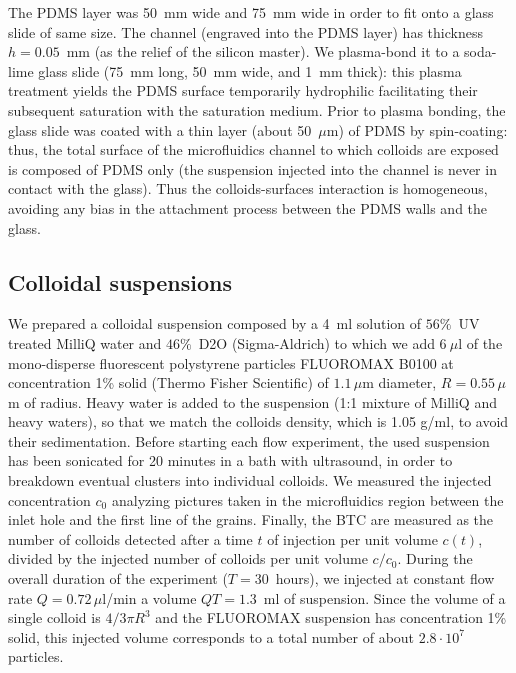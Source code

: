 \documentclass[singlecolumn,pre,notitlepage,preprintnumbers,floatfix,superscriptaddress]{revtex4-1}
\begin{document}
\noindent
The PDMS layer was 50~mm wide and 75~mm wide in order to fit onto a glass slide of same size. The channel (engraved into the PDMS layer) has thickness $h = 0.05$~mm (as the relief of the silicon master). We plasma-bond it to a soda-lime glass slide (75~mm long, 50~mm wide, and 1~mm thick): this plasma treatment yields the PDMS surface temporarily hydrophilic facilitating their subsequent saturation with the saturation medium. Prior to plasma bonding, the glass slide was coated with a thin layer (about 50~$\mu$m) of PDMS by spin-coating: thus, the total surface of the microfluidics channel to which colloids are exposed is composed of PDMS only (the suspension injected into the channel is never in contact with the glass). Thus the colloids-surfaces interaction is homogeneous, avoiding any bias in the attachment process between the PDMS walls and the glass. \\

\subsection*{Colloidal suspensions}
\noindent
We prepared a colloidal suspension composed by a 4~ml solution of $56 \%$~UV treated MilliQ water and $46\%$~D2O (Sigma-Aldrich) to which we add $6~\mu$l of the mono-disperse fluorescent polystyrene particles FLUOROMAX B0100 at concentration 1\% solid (Thermo Fisher Scientific) of $1.1 \, \mu$m diameter, $R = 0.55 \, \mu$m of radius. Heavy water is added to the suspension (1:1 mixture of MilliQ and heavy waters), so that we match the colloids density, which is 1.05 g/ml, to avoid their sedimentation. Before starting each flow experiment, the used suspension has been sonicated for 20 minutes in a bath with ultrasound, in order to breakdown eventual clusters into individual colloids. We measured the injected concentration $c_0$ analyzing pictures taken in the microfluidics region between the inlet hole and the first line of the grains. Finally, the BTC are measured as the number of colloids detected after a time $t$ of injection per unit volume $c(t)$, divided by the injected number of colloids per unit volume $c/c_0$. During the overall duration of the experiment ($T = 30$~hours), we injected at constant flow rate $Q = 0.72 \, \mu$l/min a volume $QT = 1.3$~ml of suspension. Since the volume of a single colloid is $4/3 \pi R^3$ and the FLUOROMAX suspension has concentration 1\% solid, this injected volume corresponds to a total number of about $2.8 \cdot 10^7$ particles. \\
\end{document}
